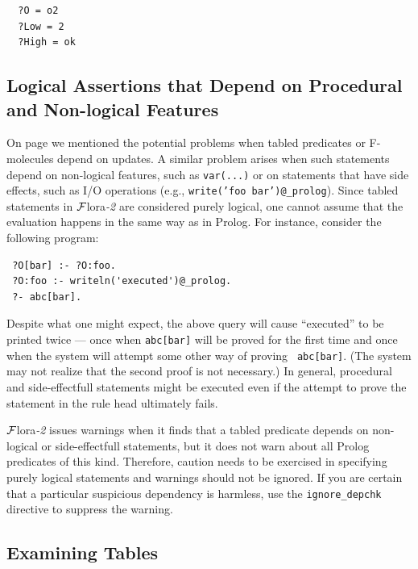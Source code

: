 \documentclass[11pt]{article}
\newcommand{\FLORA}{{\mbox{\sc ${\cal F}${lora}\rm\emph{-2}}}\xspace}
\begin{document}
\begin{itemize}
\begin{verbatim}
  ?O = o2
  ?Low = 2
  ?High = ok
\end{verbatim}

\end{itemize}



\subsection{Logical Assertions that Depend on Procedural and Non-logical Features}

On page \pageref{page-depchk} we mentioned the potential problems when
tabled predicates or F-molecules depend on updates. A similar problem
arises when such statements depend on non-logical features, such as
{\tt var(...)} or on statements that have side effects, such as I/O
operations (e.g., {\tt write('foo bar')@\_prolog}). Since tabled statements
in \FLORA are considered purely logical, one cannot assume that the
evaluation happens in the same way as in Prolog.
For instance, consider the following program:
\begin{verbatim}
 ?O[bar] :- ?O:foo.
 ?O:foo :- writeln('executed')@_prolog.  
 ?- abc[bar].
\end{verbatim}
Despite what one might expect, the above query will cause ``executed'' to
be printed twice --- once when {\tt abc[bar]} will be proved for the first
time and once when the system will attempt some other way of proving {\tt
  abc[bar]}. (The system may not realize that the second proof is not
necessary.) In general, procedural and side-effectfull statements 
might be executed even if the attempt to prove the statement in the rule
head ultimately fails.

\FLORA issues warnings when it finds that a tabled predicate depends on
non-logical or side-effectfull statements, but it does not warn about all
Prolog predicates of this kind. Therefore, caution needs to be exercised in
specifying purely logical statements and warnings should not be ignored.
If you are certain that a particular suspicious dependency
is harmless, use the {\tt ignore\_depchk} directive to suppress the warning.


\subsection{Examining Tables}
\end{document}
